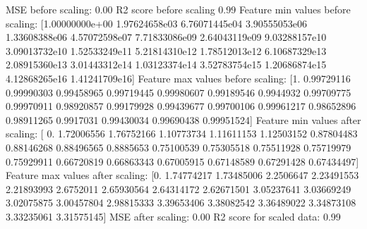 \documentclass[letterpaper,10pt,english]{sphinxmanual}
\begin{document}
\begin{sphinxVerbatim}[commandchars=\\\{\}]
   


 
\end{sphinxVerbatim}

\begin{sphinxVerbatim}[commandchars=\\\{\}]
MSE before scaling: 0.00
R2 score before scaling 0.99
Feature min values before scaling:
 [1.00000000e+00 1.97624658e\PYGZhy{}03 6.76071445e\PYGZhy{}04 3.90555053e\PYGZhy{}06
 1.33608388e\PYGZhy{}06 4.57072598e\PYGZhy{}07 7.71833086e\PYGZhy{}09 2.64043119e\PYGZhy{}09
 9.03288157e\PYGZhy{}10 3.09013732e\PYGZhy{}10 1.52533249e\PYGZhy{}11 5.21814310e\PYGZhy{}12
 1.78512013e\PYGZhy{}12 6.10687329e\PYGZhy{}13 2.08915360e\PYGZhy{}13 3.01443312e\PYGZhy{}14
 1.03123374e\PYGZhy{}14 3.52783754e\PYGZhy{}15 1.20686874e\PYGZhy{}15 4.12868265e\PYGZhy{}16
 1.41241709e\PYGZhy{}16]
Feature max values before scaling:
 [1.         0.99729116 0.99990303 0.99458965 0.99719445 0.99980607
 0.99189546 0.9944932  0.99709775 0.99970911 0.98920857 0.99179928
 0.99439677 0.99700106 0.99961217 0.98652896 0.98911265 0.9917031
 0.99430034 0.99690438 0.99951524]
Feature min values after scaling:
 [ 0.         \PYGZhy{}1.72006556 \PYGZhy{}1.76752166 \PYGZhy{}1.10773734 \PYGZhy{}1.11611153 \PYGZhy{}1.12503152
 \PYGZhy{}0.87804483 \PYGZhy{}0.88146268 \PYGZhy{}0.88496565 \PYGZhy{}0.8885653  \PYGZhy{}0.75100539 \PYGZhy{}0.75305518
 \PYGZhy{}0.75511928 \PYGZhy{}0.75719979 \PYGZhy{}0.75929911 \PYGZhy{}0.66720819 \PYGZhy{}0.66863343 \PYGZhy{}0.67005915
 \PYGZhy{}0.67148589 \PYGZhy{}0.67291428 \PYGZhy{}0.67434497]
Feature max values after scaling:
 [0.         1.74774217 1.73485006 2.2506647  2.23491553 2.21893993
 2.6752011  2.65930564 2.64314172 2.62671501 3.05237641 3.03669249
 3.02075875 3.00457804 2.98815333 3.39653406 3.38082542 3.36489022
 3.34873108 3.33235061 3.31575145]
MSE after  scaling: 0.00
R2 score for  scaled data: 0.99
\end{sphinxVerbatim}
\end{document}
